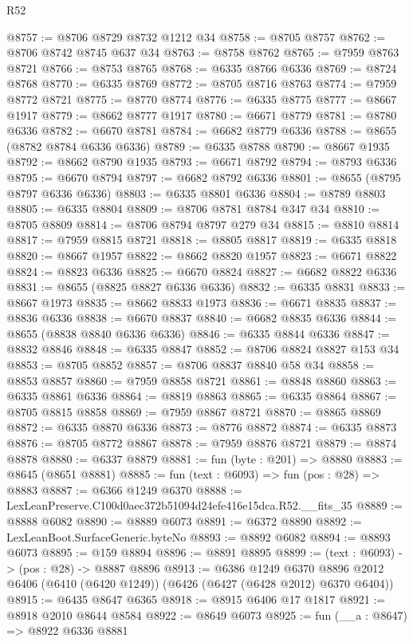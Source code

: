 \begin{lexlean}{R52}
\begin{coremodule}
@8757 := @8706 @8729 @8732 @1212 @34
@8758 := @8705 @8757
@8762 := @8706 @8742 @8745 @637 @34
@8763 := @8758 @8762
@8765 := @7959 @8763 @8721
@8766 := @8753 @8765
@8768 := @6335 @8766 @6336
@8769 := @8724 @8768
@8770 := @6335 @8769
@8772 := @8705 @8716 @8763
@8774 := @7959 @8772 @8721
@8775 := @8770 @8774
@8776 := @6335 @8775
@8777 := @8667 @1917
@8779 := @8662 @8777 @1917
@8780 := @6671 @8779
@8781 := @8780 @6336
@8782 := @6670 @8781
@8784 := @6682 @8779 @6336
@8788 := @8655 (@8782 @8784 @6336 @6336)
@8789 := @6335 @8788
@8790 := @8667 @1935
@8792 := @8662 @8790 @1935
@8793 := @6671 @8792
@8794 := @8793 @6336
@8795 := @6670 @8794
@8797 := @6682 @8792 @6336
@8801 := @8655 (@8795 @8797 @6336 @6336)
@8803 := @6335 @8801 @6336
@8804 := @8789 @8803
@8805 := @6335 @8804
@8809 := @8706 @8781 @8784 @347 @34
@8810 := @8705 @8809
@8814 := @8706 @8794 @8797 @279 @34
@8815 := @8810 @8814
@8817 := @7959 @8815 @8721
@8818 := @8805 @8817
@8819 := @6335 @8818
@8820 := @8667 @1957
@8822 := @8662 @8820 @1957
@8823 := @6671 @8822
@8824 := @8823 @6336
@8825 := @6670 @8824
@8827 := @6682 @8822 @6336
@8831 := @8655 (@8825 @8827 @6336 @6336)
@8832 := @6335 @8831
@8833 := @8667 @1973
@8835 := @8662 @8833 @1973
@8836 := @6671 @8835
@8837 := @8836 @6336
@8838 := @6670 @8837
@8840 := @6682 @8835 @6336
@8844 := @8655 (@8838 @8840 @6336 @6336)
@8846 := @6335 @8844 @6336
@8847 := @8832 @8846
@8848 := @6335 @8847
@8852 := @8706 @8824 @8827 @153 @34
@8853 := @8705 @8852
@8857 := @8706 @8837 @8840 @58 @34
@8858 := @8853 @8857
@8860 := @7959 @8858 @8721
@8861 := @8848 @8860
@8863 := @6335 @8861 @6336
@8864 := @8819 @8863
@8865 := @6335 @8864
@8867 := @8705 @8815 @8858
@8869 := @7959 @8867 @8721
@8870 := @8865 @8869
@8872 := @6335 @8870 @6336
@8873 := @8776 @8872
@8874 := @6335 @8873
@8876 := @8705 @8772 @8867
@8878 := @7959 @8876 @8721
@8879 := @8874 @8878
@8880 := @6337 @8879
@8881 := fun (byte : @201) => @8880
@8883 := @8645 (@8651 @8881)
@8885 := fun (text : @6093) => fun (pos : @28) => @8883
@8887 := @6366 @1249 @6370
@8888 := LexLeanPreserve.C100d0aec372b51094d24efe416e15dca.R52.__fits_35
@8889 := @8888 @6082
@8890 := @8889 @6073
@8891 := @6372 @8890
@8892 := LexLeanBoot.SurfaceGeneric.byteNo
@8893 := @8892 @6082
@8894 := @8893 @6073
@8895 := @159 @8894
@8896 := @8891 @8895
@8899 := (text : @6093) -> (pos : @28) -> @8887 @8896
@8913 := @6386
    @1249
    @6370
    @8896
    @2012
    @6406
    (@6410 (@6420 @1249))
    (@6426 (@6427 (@6428 @2012) @6370 @6404))
@8915 := @6435 @8647 @6365
@8918 := @8915 @6406 @17 @1817
@8921 := @8918 @2010 @8644 @8584
@8922 := @8649 @6073
@8925 := fun (__a : @8647) => @8922 @6336 @8881

\end{coremodule}
\end{lexlean}

